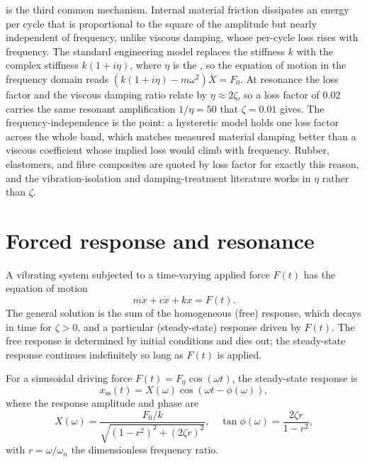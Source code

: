  is the third common
mechanism. Internal material friction dissipates an energy per cycle
that is proportional to the square of the amplitude but nearly
independent of frequency, unlike viscous damping, whose per-cycle loss
rises with frequency. The standard engineering model replaces the
stiffness $k$ with the complex stiffness $k(1 + i\eta)$, where $\eta$
is the , so the equation of motion in the
frequency domain reads $(k(1 + i\eta) - m\omega^2)\bar{X} = F_0$. At
resonance the loss factor and the viscous damping ratio relate by
$\eta \approx 2\zeta$, so a loss factor of $0.02$ carries the same
resonant amplification $1/\eta = 50$ that $\zeta = 0.01$ gives. The
frequency-independence is the point: a hysteretic model holds one loss
factor across the whole band, which matches measured material damping
better than a viscous coefficient whose implied loss would climb with
frequency. Rubber, elastomers, and fibre composites are quoted by loss
factor for exactly this reason, and the vibration-isolation and
damping-treatment literature works in $\eta$ rather than $\zeta$.

\section{Forced response and resonance}

A vibrating system subjected to a time-varying applied force
$F(t)$ has the equation of motion
\[
m\ddot{x} + c\dot{x} + kx = F(t).
\]
The general solution is the sum of the homogeneous (free) response,
which decays in time for $\zeta > 0$, and a particular (steady-state)
response driven by $F(t)$. The free response is determined by initial
conditions and dies out; the steady-state response continues
indefinitely so long as $F(t)$ is applied.

For a sinusoidal driving force $F(t) = F_0 \cos(\omega t)$, the
steady-state response is
\[
x_{\text{ss}}(t) = X(\omega) \cos(\omega t - \phi(\omega)),
\]
where the response amplitude and phase are
\[
X(\omega) = \frac{F_0/k}{\sqrt{(1 - r^2)^2 + (2\zeta r)^2}}, \quad
\tan\phi(\omega) = \frac{2\zeta r}{1 - r^2},
\]
with $r = \omega/\omega_n$ the dimensionless frequency ratio.

